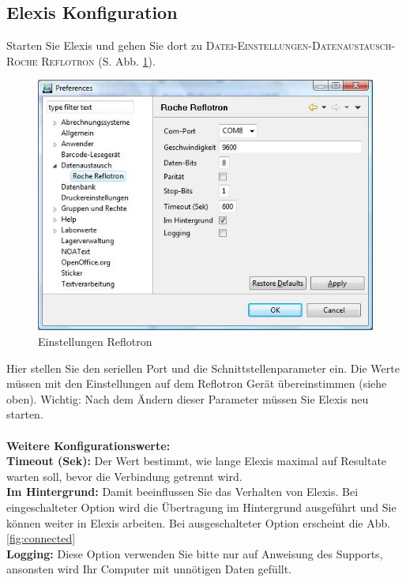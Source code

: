 \documentclass[a4paper]{scrartcl}
\begin{document}
\subsection{Elexis Konfiguration}
Starten Sie Elexis und gehen Sie dort zu \textsc{Datei-Einstellungen-Datenaustausch-Roche Reflotron} (S. Abb. \ref{fig:config}).
\begin{figure}[h]
    \includegraphics{config}
    \caption{Einstellungen Reflotron}
    \label{fig:config}
\end{figure}
Hier stellen Sie den seriellen Port und die Schnittstellenparameter ein. Die Werte m\"ussen mit den Einstellungen auf dem Reflotron Ger\"at \"ubereinstimmen (siehe oben). Wichtig: Nach dem \"Andern dieser Parameter m\"ussen Sie Elexis neu starten.\\
\\
\textbf{Weitere Konfigurationswerte:}\\
\textbf{Timeout (Sek):} Der Wert bestimmt, wie lange Elexis maximal auf Resultate warten soll, bevor die Verbindung getrennt wird.\\
\textbf{Im Hintergrund:} Damit beeinflussen Sie das Verhalten von Elexis. Bei eingeschalteter Option wird die \"Ubertragung im Hintergrund ausgef\"uhrt und Sie k\"onnen weiter in Elexis arbeiten. Bei ausgeschalteter Option erscheint die Abb. \ref{fig:connected}\\
\textbf{Logging:} Diese Option verwenden Sie bitte nur auf Anweisung des Supports, ansonsten wird Ihr Computer mit unn\"otigen Daten gef\"ullt.\\
\end{document}

